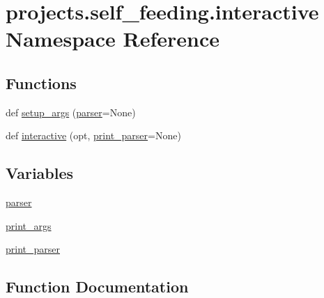\hypertarget{namespaceprojects_1_1self__feeding_1_1interactive}{}\section{projects.\+self\+\_\+feeding.\+interactive Namespace Reference}
\label{namespaceprojects_1_1self__feeding_1_1interactive}
\subsection*{Functions}
\begin{DoxyCompactItemize}
\item 
def \hyperlink{namespaceprojects_1_1self__feeding_1_1interactive_a2ad3b874d9caef6e76ea41e029b933f0}{setup\+\_\+args} (\hyperlink{namespaceprojects_1_1self__feeding_1_1interactive_a21a1ccd7eaed52bc0c86433980389559}{parser}=None)
\item 
def \hyperlink{namespaceprojects_1_1self__feeding_1_1interactive_aaebd4c577ab0371c73e8442be469ebab}{interactive} (opt, \hyperlink{namespaceprojects_1_1self__feeding_1_1interactive_a066fbd25c1838df96d5bd360e85cf30b}{print\+\_\+parser}=None)
\end{DoxyCompactItemize}
\subsection*{Variables}
\begin{DoxyCompactItemize}
\item 
\hyperlink{namespaceprojects_1_1self__feeding_1_1interactive_a21a1ccd7eaed52bc0c86433980389559}{parser}
\item 
\hyperlink{namespaceprojects_1_1self__feeding_1_1interactive_abdce103624ad6f29cbdcbff75674ccfc}{print\+\_\+args}
\item 
\hyperlink{namespaceprojects_1_1self__feeding_1_1interactive_a066fbd25c1838df96d5bd360e85cf30b}{print\+\_\+parser}
\end{DoxyCompactItemize}


\subsection{Function Documentation}
\mbox{\label{namespaceprojects_1_1self__feeding_1_1interactive_aaebd4c577ab0371c73e8442be469ebab}} 
